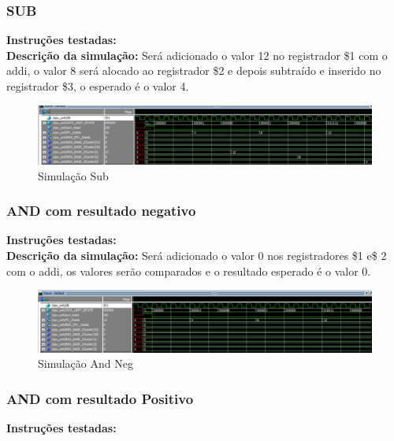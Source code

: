 \subsubsection{SUB}
\textbf{Instruções testadas:}
 \\

\textbf{Descrição da simulação:} Será adicionado o valor 12 no registrador \$1 com o addi, o valor 8 será alocado ao registrador \$2 e depois subtraído e inserido no registrador \$3, o esperado é o valor 4.\\

\begin{figure}[htbp!]
\centering
\includegraphics[width=1\textwidth]{figure/simulacao_sub.png}
\caption{Simulação Sub} 
\label{fig:imagem_massa}
\end{figure}

\subsubsection{AND com resultado negativo}
\textbf{Instruções testadas:}
 \\

\textbf{Descrição da simulação:} Será adicionado o valor 0 nos registradores \$1 e\$ 2 com o addi, os valores serão comparados e o resultado esperado é o valor 0. \\

\begin{figure}[htbp!]
\centering
\includegraphics[width=1\textwidth]{figure/simulacao_and_neg.png}
\caption{Simulação And Neg} 
\label{fig:imagem_massa}
\end{figure}

\subsubsection{AND com resultado Positivo}
\textbf{Instruções testadas:} 
 \\

